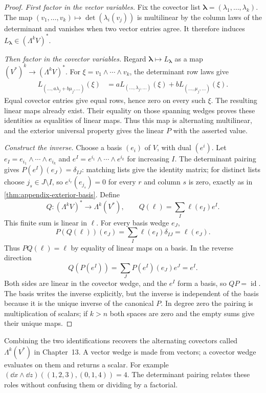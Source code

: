 \begin{proof}
\emph{First factor in the vector variables.} Fix the covector list
$\boldsymbol\lambda=(\lambda_1,\ldots,\lambda_k)$. The map
$(v_1,\ldots,v_k)\mapsto\det(\lambda_i(v_j))$ is multilinear by the
column laws of the determinant and vanishes when two vector entries agree.
It therefore induces $L_{\boldsymbol\lambda}\in(\Lambda^kV)^*$.

\emph{Then factor in the covector variables.} Regard
$\boldsymbol\lambda\mapsto L_{\boldsymbol\lambda}$ as a map
$(V^*)^k\to(\Lambda^kV)^*$. For $\xi=v_1\wedge\cdots\wedge v_k$, the determinant row laws give
\[
\begin{aligned}
L_{(\ldots,a\lambda_j+b\mu_j,\ldots)}(\xi)
&=aL_{(\ldots,\lambda_j,\ldots)}(\xi)
+bL_{(\ldots,\mu_j,\ldots)}(\xi).
\end{aligned}
\]
Equal covector entries give equal rows, hence zero on every such $\xi$.
The resulting linear maps already exist. Their equality on those spanning
wedges proves these identities as equalities of linear maps. Thus this
map is alternating multilinear, and the exterior universal property gives
the linear $P$ with the asserted value.

\emph{Construct the inverse.} Choose a basis $(e_i)$ of $V$, with dual
$(e^i)$. Let $e_I=e_{i_1}\wedge\cdots\wedge e_{i_k}$ and
$e^I=e^{i_1}\wedge\cdots\wedge e^{i_k}$ for increasing $I$.
The determinant pairing gives $P(e^I)(e_J)=\delta_{IJ}$: matching lists
give the identity matrix; for distinct lists choose $j_s\in J\setminus I$,
so $e^{i_r}(e_{j_s})=0$ for every $r$ and column $s$ is zero, exactly
as in \cref{thm:appendix-exterior-basis}.
Define
\[
Q:(\Lambda^kV)^*\to\Lambda^k(V^*),\qquad Q(\ell)=\sum_I\ell(e_I)e^I.
\]
This finite sum is linear in $\ell$. For every basis wedge $e_J$,
\[
P(Q(\ell))(e_J)=\sum_I\ell(e_I)\delta_{IJ}=\ell(e_J).
\]
Thus $PQ(\ell)=\ell$ by equality of linear maps on a basis.
In the reverse direction
\[
Q(P(e^I))=\sum_JP(e^I)(e_J)e^J=e^I.
\]
Both sides are linear in the covector wedge, and the $e^I$ form a basis,
so $QP=\operatorname{id}$. The basis writes the inverse explicitly, but
the inverse is independent of the basis because it is the unique inverse
of the canonical $P$. In degree zero the pairing is multiplication of
scalars; if $k>n$ both spaces are zero and the empty sums give their unique maps.
\end{proof}
Combining the two identifications recovers the alternating covectors called
$\Lambda^k(V^*)$ in Chapter~13. A vector wedge is made from vectors; a
covector wedge evaluates on them and returns a scalar. For example
$(\dd x\wedge\dd z)((1,2,3),(0,1,4))=4$. The determinant pairing
relates these roles without confusing them or dividing by a factorial.

